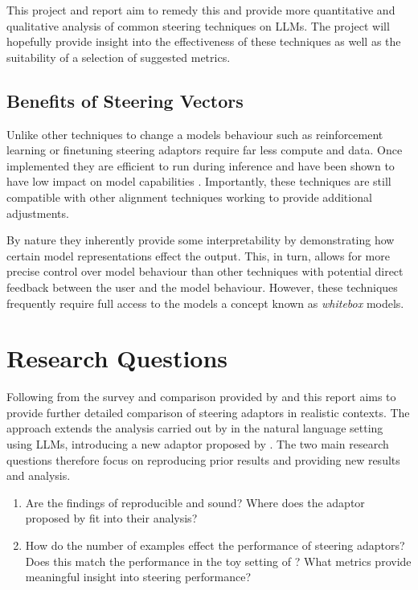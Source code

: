 This project and report aim to remedy this and provide more quantitative and qualitative analysis of common steering techniques on LLMs.
The project will hopefully provide insight into the effectiveness of these techniques as well as the suitability of a selection of suggested metrics.

\subsection{Benefits of Steering Vectors}

Unlike other techniques to change a models behaviour such as reinforcement learning \citep{rl, rlhf} or finetuning \citep{lora} steering adaptors require far less compute and data.
Once implemented they are efficient to run during inference and have been shown to have low impact on model capabilities \citep{steering-wo-ss, sea}.
Importantly, these techniques are still compatible with other alignment techniques working to provide additional adjustments.

By nature they inherently provide some interpretability by demonstrating how certain model representations effect the output.
This, in turn, allows for more precise control over model behaviour than other techniques with potential direct feedback between the user and the model behaviour.
However, these techniques frequently require full access to the models a concept known as \emph{whitebox} models.

\section{Research Questions}

Following from the survey and comparison provided by \citet{steering-taxonomy} and \citet{steerability} this report aims to provide further detailed comparison of steering adaptors in realistic contexts.
The approach extends the analysis carried out by \citet{steering-clear} in the natural language setting using LLMs, introducing a new adaptor proposed by \citet{ace}.
The two main research questions therefore focus on reproducing prior results and providing new results and analysis.

\begin{enumerate}
    \item Are the findings of \citet{steering-clear} reproducible and sound? Where does the adaptor proposed by \citet{ace} fit into their analysis?
    \item How do the number of examples effect the performance of steering adaptors? Does this match the performance in the toy setting of \citet{steering-clear}? What metrics provide meaningful insight into steering performance?
\end{enumerate}

